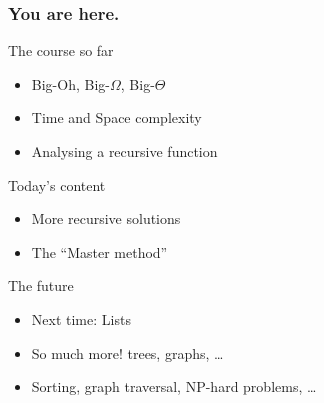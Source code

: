 \begin{frame}
	\frametitle{You are here.}
	\begin{block}{The course so far}
		\begin{itemize}
			\item Big-Oh, Big-$\Omega$, Big-$\Theta$
			\item Time and Space complexity
			\item Analysing a recursive function
		\end{itemize}
	\end{block}
	\pause
	\begin{exampleblock}{Today's content}
		\begin{itemize}
			\item More recursive solutions
			\item The ``Master method''
		\end{itemize}
	\end{exampleblock}
	\pause
	\begin{block}{The future}
		\begin{itemize}
			\item Next time: Lists
			\item So much more! trees, graphs, \dots
			\item Sorting, graph traversal, NP-hard problems, \dots
		\end{itemize}
	\end{block}
\end{frame}
